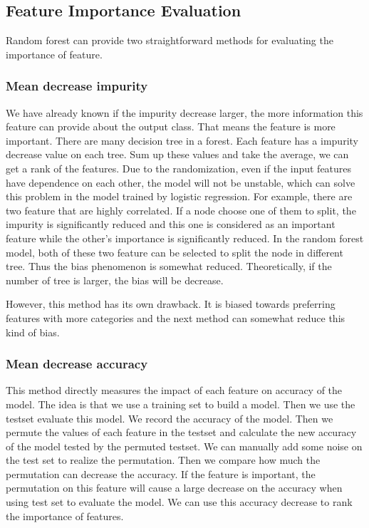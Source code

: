 \subsection{Feature Importance Evaluation}
Random forest can provide two straightforward methods for evaluating the importance of feature.
\subsubsection{Mean decrease impurity}
We have already known if the impurity decrease larger, the more information this feature can provide about the output class. That means the feature is more important. There are many decision tree in a forest. Each feature has a impurity decrease value on each tree. Sum up these values and take the average, we can get a rank of the features. Due to the randomization, even if the input features have dependence on each other, the model will not be unstable, which can solve this problem in the model trained by logistic regression. For example, there are two feature that are highly correlated. If a node choose one of them to split, the impurity is significantly reduced and this one is considered as an important feature while the other's importance is significantly reduced. In the random forest model, both of these two feature can be selected to split the node in different tree. Thus the bias phenomenon is somewhat reduced. Theoretically, if the number of tree is larger, the bias will be decrease.

However, this method has its own drawback. It is biased towards preferring features with more categories\cite{strobl2007bias} and the next method can somewhat reduce this kind of bias. 

\subsubsection{Mean decrease accuracy}
This method directly measures the impact of each feature on accuracy of the model. The idea is that we use a training set to build a model. Then we use the testset evaluate this model. We record the accuracy of the model. Then we permute the values of each feature in the testset and calculate the new accuracy of the model tested by the permuted testset. We can manually add some noise on the test set to realize the permutation. Then we compare how much the permutation can decrease the accuracy. If the feature is important, the permutation on this feature will cause a large decrease on the accuracy when using test set to evaluate the model. We can use this accuracy decrease to rank the importance of features.

